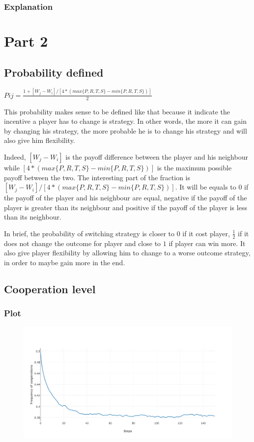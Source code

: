 \documentclass[11pt]{article}
\begin{document}
\subsubsection{Explanation}
 
\section{Part 2}

\subsection{Probability defined}

$Pij = \frac{1 + [W_j-W_i]/[4*(max\{P,R,T,S\} - min\{P,R,T,S\})]}{2}$ 

This probability makes sense to be defined like that because it indicate the incentive a player has to change is strategy. In other words, the more it can gain by changing his strategy, the more probable he is to change his strategy and will also give him flexibility. 

Indeed, $[W_j-W_i]$ is the payoff difference between the player and his neighbour while $ [4*(max\{P,R,T,S\} - min\{P,R,T,S\})]$ is the maximum possible payoff between the two. The interesting part of the fraction is $[W_j-W_i]/[4*(max\{P,R,T,S\} - min\{P,R,T,S\})]$. It will be equals to 0 if the payoff of the player and his neighbour are equal, negative if the payoff of the player is greater than its neighbour and positive if the payoff of the player is less than its neighbour.

In brief, the probability of switching strategy is closer to 0 if it cost player, $\frac{1}{2}$ if it does not change the outcome for player and close to $1$ if player can win more. It also give player flexibility by allowing him to change to a worse outcome strategy, in order to maybe gain more in the end.

\subsection{Cooperation level}

\subsubsection{Plot}
 
\begin{figure}[H]
\centering
   \includegraphics[width=\textwidth]{img/part2/part2-moore-notmyself.png}
\end{figure}
\end{document}
